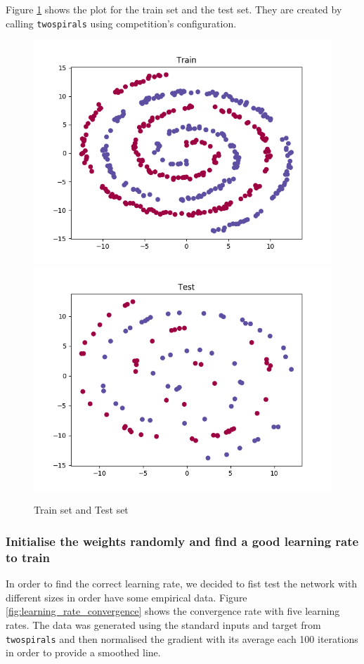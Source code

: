 \documentclass[11pt]{article}
\begin{document}
Figure \ref{fig: train_test_set} shows the plot for the train set and the test set. They are created by calling \texttt{twospirals} using competition's configuration.
\begin{figure}[h]
	\label{fig: train_test_set}
	\centering
	\includegraphics[scale=0.5]{images/train_set}
	\includegraphics[scale=0.5]{images/test_set}
	\caption{Train set and Test set}
\end{figure}


\subsubsection{Initialise the weights randomly and find a good learning rate to train}
In order to find the correct learning rate, we decided to fist test the network with different sizes in order have some empirical data. Figure \ref{fig:learning_rate_convergence} shows the convergence rate with five learning rates. The data was generated using the standard inputs and target from \texttt{twospirals} and then normalised the gradient with its average each 100 iterations in order to provide a smoothed line.
\end{document}
